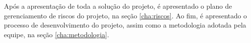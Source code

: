 	Após a apresentação de toda a solução do projeto, é apresentado o plano de gerenciamento de riscos do projeto, na seção \ref{cha:riscos}. Ao fim, é apresentado o processo de desenvolvimento do projeto, assim como a metodologia adotada pela equipe, na seção \ref{cha:metodologia}.
